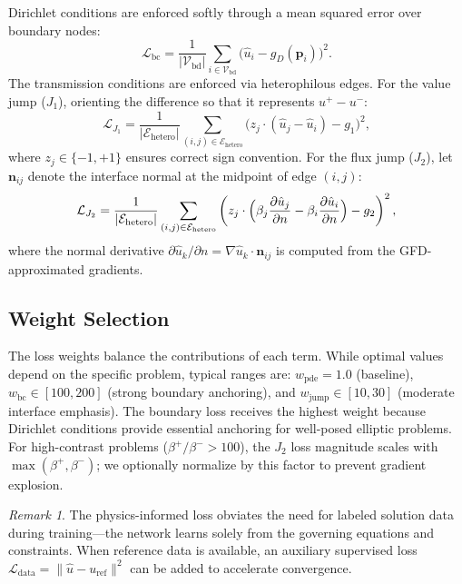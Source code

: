 \documentclass[11pt]{article}
\theoremstyle{definition}
\theoremstyle{remark}
\newtheorem{remark}{Remark}
\theoremstyle{plain}
\begin{document}
Dirichlet conditions are enforced softly through a mean squared error over boundary nodes:
\begin{equation}
    \mathcal{L}_{\text{bc}} = \frac{1}{|\mathcal{V}_{\text{bd}}|} \sum_{i \in \mathcal{V}_{\text{bd}}} \bigl( \hat{u}_i - g_D(\mathbf{p}_i) \bigr)^2.
\end{equation}
The transmission conditions are enforced via heterophilous edges. For the value jump ($J_1$), orienting the difference so that it represents $u^+ - u^-$:
\begin{equation}
    \mathcal{L}_{J_1} = \frac{1}{|\mathcal{E}_{\text{hetero}}|} \sum_{(i,j) \in \mathcal{E}_{\text{hetero}}} \bigl( z_j \cdot (\hat{u}_j - \hat{u}_i) - g_1 \bigr)^2,
\end{equation}
where $z_j \in \{-1, +1\}$ ensures correct sign convention. For the flux jump ($J_2$), let $\mathbf{n}_{ij}$ denote the interface normal at the midpoint of edge $(i, j)$:
\begin{equation}
    \mathcal{L}_{J_2} = \frac{1}{|\mathcal{E}_{\text{hetero}}|} \sum_{(i,j) \in \mathcal{E}_{\text{hetero}}} \left( z_j \cdot \Bigl( \beta_j \frac{\partial \hat{u}_j}{\partial n} - \beta_i \frac{\partial \hat{u}_i}{\partial n} \Bigr) - g_2 \right)^2,
\end{equation}
where the normal derivative $\partial \hat{u}_k / \partial n = \nabla \hat{u}_k \cdot \mathbf{n}_{ij}$ is computed from the GFD-approximated gradients.

\subsection{Weight Selection}

The loss weights balance the contributions of each term. While optimal values depend on the specific problem, typical ranges are: $w_{\text{pde}} = 1.0$ (baseline), $w_{\text{bc}} \in [100, 200]$ (strong boundary anchoring), and $w_{\text{jump}} \in [10, 30]$ (moderate interface emphasis). The boundary loss receives the highest weight because Dirichlet conditions provide essential anchoring for well-posed elliptic problems. For high-contrast problems ($\beta^+ / \beta^- > 100$), the $J_2$ loss magnitude scales with $\max(\beta^+, \beta^-)$; we optionally normalize by this factor to prevent gradient explosion.

\begin{remark}
    The physics-informed loss obviates the need for labeled solution data during training---the network learns solely from the governing equations and constraints. When reference data is available, an auxiliary supervised loss $\mathcal{L}_{\text{data}} = \| \hat{u} - u_{\text{ref}} \|^2$ can be added to accelerate convergence.
\end{remark}
\end{document}

